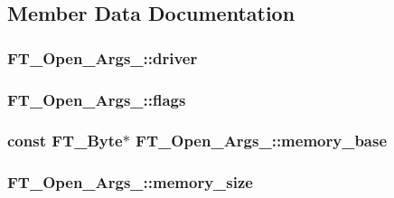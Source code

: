 \subsection{Member Data Documentation}
\hypertarget{struct_f_t___open___args___a7c01bd7e34a440c3e89141ee521e2646}{
\subsubsection[{driver}]{ F\-T\-\_\-\-Open\-\_\-\-Args\-\_\-\-::driver}}\label{struct_f_t___open___args___a7c01bd7e34a440c3e89141ee521e2646}
\hypertarget{struct_f_t___open___args___a2e3e6b9284fe8b4d9833e247a19181fa}{
\subsubsection[{flags}]{ F\-T\-\_\-\-Open\-\_\-\-Args\-\_\-\-::flags}}\label{struct_f_t___open___args___a2e3e6b9284fe8b4d9833e247a19181fa}
\hypertarget{struct_f_t___open___args___a1231da51bc58922096b3bc603bb2ffb0}{
\subsubsection[{memory\-\_\-base}]{\setlength{\rightskip}{0pt plus 5cm}const {\bf F\-T\-\_\-\-Byte}$\ast$ F\-T\-\_\-\-Open\-\_\-\-Args\-\_\-\-::memory\-\_\-base}}\label{struct_f_t___open___args___a1231da51bc58922096b3bc603bb2ffb0}
\hypertarget{struct_f_t___open___args___a87f0bb2f257abe94c93a79e0de3525da}{
\subsubsection[{memory\-\_\-size}]{ F\-T\-\_\-\-Open\-\_\-\-Args\-\_\-\-::memory\-\_\-size}}\label{struct_f_t___open___args___a87f0bb2f257abe94c93a79e0de3525da}
